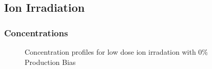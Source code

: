 \documentclass[a4paper]{article}
\begin{document}
  \subsection{Ion Irradiation}
    \subsubsection{Concentrations}
      \begin{figure}[h!]  %
        \centering
        \qquad
        \caption{Concentration profiles for low dose ion irradation with 0\% Production Bias}
        \label{figure:concentrations_ion_0_1e-6}
      \end{figure}
\end{document}
